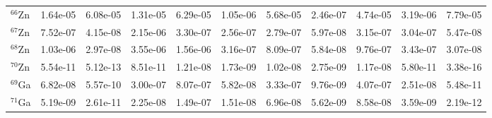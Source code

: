 \begin{landscape}
\begin{table}
\begin{tabular}{l|cc|cc|cc|cc|cc}
$^{66}$Zn & 1.64e-05 & 6.08e-05 & 1.31e-05 & 6.29e-05 & 1.05e-06 & 5.68e-05 & 2.46e-07 & 4.74e-05 & 3.19e-06 & 7.79e-05\\
$^{67}$Zn & 7.52e-07 & 4.15e-08 & 2.15e-06 & 3.30e-07 & 2.56e-07 & 2.79e-07 & 5.97e-08 & 3.15e-07 & 3.04e-07 & 5.47e-08\\
$^{68}$Zn & 1.03e-06 & 2.97e-08 & 3.55e-06 & 1.56e-06 & 3.16e-07 & 8.09e-07 & 5.84e-08 & 9.76e-07 & 3.43e-07 & 3.07e-08\\
$^{70}$Zn & 5.54e-11 & 5.12e-13 & 8.51e-11 & 1.21e-08 & 1.73e-09 & 1.02e-08 & 2.75e-09 & 1.17e-08 & 5.80e-11 & 3.38e-16\\
$^{69}$Ga & 6.82e-08 & 5.57e-10 & 3.00e-07 & 8.07e-07 & 5.82e-08 & 3.33e-07 & 9.76e-09 & 4.07e-07 & 2.51e-08 & 5.48e-11\\
$^{71}$Ga & 5.19e-09 & 2.61e-11 & 2.25e-08 & 1.49e-07 & 1.51e-08 & 6.96e-08 & 5.62e-09 & 8.58e-08 & 3.59e-09 & 2.19e-12\\
\hline
\end{tabular}
\end{table}
\end{landscape}



